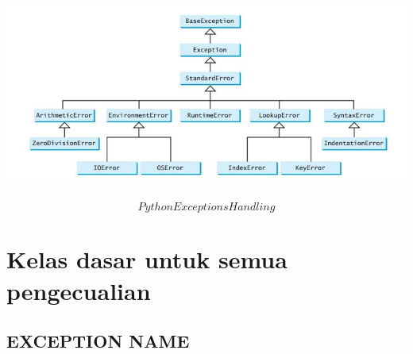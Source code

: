  \includegraphics[width=15cm,height=7cm]{Gambar/dapi5.jpg}
 \begin{equation}Python Exceptions Handling\end{equation}
 

\section{Kelas dasar untuk semua pengecualian } 

\subsection{EXCEPTION NAME }

